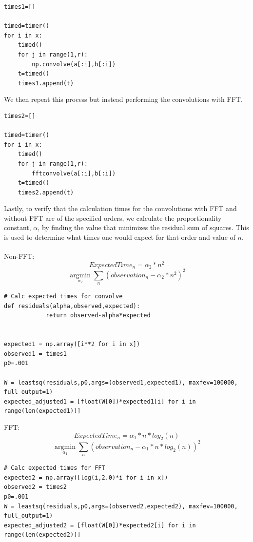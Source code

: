 \begin{lstlisting}[caption={Convolution without FFT},label=lst:convnofft,firstnumber=48]
times1=[]

timed=timer()
for i in x:
    timed()
    for j in range(1,r):
        np.convolve(a[:i],b[:i])
    t=timed()
    times1.append(t)
\end{lstlisting}\noindent
We then repeat this process but instead performing the convolutions with FFT.

\begin{lstlisting}[caption={Convolution with FFT},label=lst:convwfft,firstnumber=62]
times2=[]

timed=timer()
for i in x:
    timed()
    for j in range(1,r):
        fftconvolve(a[:i],b[:i])
    t=timed()
    times2.append(t)
\end{lstlisting}\noindent
Lastly, to verify that the calculation times for the convolutions with FFT and without FFT are of the specified orders, we calculate the proportionality constant, $\alpha$, by finding the value that minimizes the residual sum of squares. This is used to determine what times one would expect for that order and value of $n$.
\\\\
Non-FFT:
\begin{equation}
    ExpectedTime_n=\alpha_2*n^2
\end{equation}\noindent
\begin{equation}
    \underset{\alpha_2}{\operatorname{argmin}}
    \sum_{n}(observation_n-\alpha_2*n^2)^2
\end{equation}\noindent


\begin{lstlisting}[caption={Calculating the proportionality constants for Non-FFT},label=lst:constcalc,firstnumber=77]
# Calc expected times for convolve
def residuals(alpha,observed,expected):
            return observed-alpha*expected

        
expected1 = np.array([i**2 for i in x])
observed1 = times1
p0=.001

W = leastsq(residuals,p0,args=(observed1,expected1), maxfev=100000, full_output=1)
expected_adjusted1 = [float(W[0])*expected1[i] for i in range(len(expected1))]
\end{lstlisting}
FFT:
\begin{equation}
    ExpectedTime_n=\alpha_1*n*log_2(n)
\end{equation}\noindent
\begin{equation}
    \underset{\alpha_1}{\operatorname{argmin}}
    \sum_{n}(observation_n-\alpha_1*n*log_2(n))^2
\end{equation}\noindent
\begin{lstlisting}[caption={Calculating the proportionality constants for FFT},label=lst:propcalc,firstnumber=77]
# Calc expected times for FFT
expected2 = np.array([log(i,2.0)*i for i in x])
observed2 = times2
p0=.001
W = leastsq(residuals,p0,args=(observed2,expected2), maxfev=100000, full_output=1)
expected_adjusted2 = [float(W[0])*expected2[i] for i in range(len(expected2))]
\end{lstlisting}

